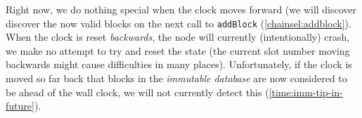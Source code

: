 Right now, we do nothing special when the clock moves forward (we will discover
discover the now valid blocks on the next call to \lstinline!addBlock!
(\cref{chainsel:addblock}). When the clock is reset \emph{backwards}, the node
will currently (intentionally) crash, we make no attempt to try and reset
the state (the current slot number moving backwards might cause difficulties
in many places). Unfortunately, if the clock is moved so far back that blocks
in the \emph{immutable database} are now considered to be ahead of the wall
clock, we will not currently detect this (\cref{time:imm-tip-in-future}).
